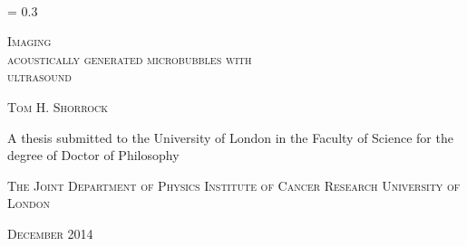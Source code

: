 


\newcommand*{\titleEI}{\begingroup%
\FSfont{5gl}%
\drop = 0.3\textheight
\vspace*{\drop}
\raggedright
{\LARGE {\huge C}ONUNDRUMS \textit{and} \\
\hspace*{30pt} {\huge E}NIGMAS\par}
\vspace{2\baselineskip}
{\large\ltseries\hspace*{15pt} {\LARGE T}WENTY {\LARGE Y}EARS \\[.1\baselineskip]
\hspace*{15pt} OF {\LARGE P}UZZLEMENTS}\par
\vspace{2\baselineskip}
\hspace*{15pt}{\ltseries \textit{\large {\footnotesize BY} The Author}}\par
\vfill
The Publisher {\footnotesize YEAR}
\endgroup}


\thispagestyle{empty}

\mbox{  }
\begin{center}
\drop = 0.3\textheight
\vspace*{\drop}
\vspace{10mm}
\LARGE
\raggedright
{\textsc{\hspace*{223pt}Imaging \\acoustically  generated microbubbles  {\large{with}}\\ \hspace*{198pt}ultrasound}}

\vspace{10mm}
\large
{\textsc{\hspace*{190pt}Tom H. Shorrock}}

\vspace{25mm}\vfill
\large
\hspace*{40.5pt}A thesis submitted to the University of London in the \linebreak
\hspace*{24pt}Faculty of Science for the degree of Doctor of Philosophy \linebreak
\vspace{20mm}\vfill


\vspace{2mm}
\large
{\textsc{\hspace*{112pt}The Joint Department of Physics  \linebreak
\hspace*{124pt}Institute of Cancer Research \linebreak
\hspace*{165pt}University of London
}}

\vspace{2mm}

\large
{\textsc{\hspace*{202pt}December 2014}}

\end{center}


